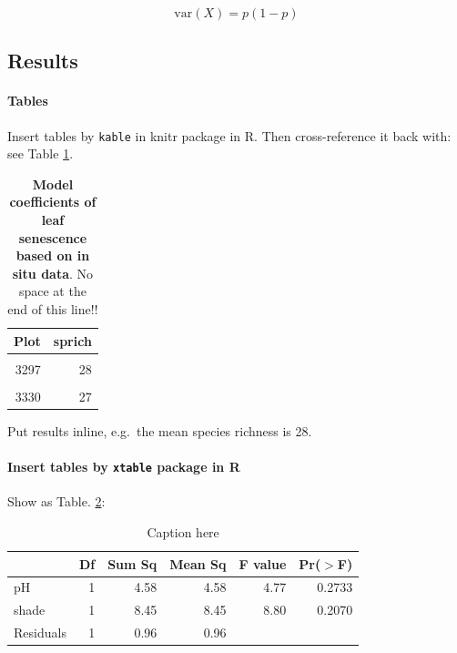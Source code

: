 \documentclass[
  12pt,
]{article}
\begin{document}
\[\text{var}(X) = p(1-p)\]

\hypertarget{results}{%
\subsection{Results}\label{results}}

\hypertarget{tables}{%
\paragraph{Tables}\label{tables}}

Insert tables by \texttt{kable} in knitr package in R. Then cross-reference it back with: see Table \ref{tab:tableName}.



\begin{table}[H]

\caption{\label{tab:tableName}\textbf{Model coefficients of leaf senescence based on in situ data}. No space at the end of this line!!}
\centering
\begin{tabular}[t]{rr}
\toprule
Plot & sprich\\
\midrule
\cellcolor{gray!6}{3294} & \cellcolor{gray!6}{31}\\
3297 & 28\\
\cellcolor{gray!6}{3299} & \cellcolor{gray!6}{26}\\
3330 & 27\\
\bottomrule
\end{tabular}
\end{table}

Put results inline, e.g.~the mean species richness is 28.

\hypertarget{insert-tables-by-xtable-package-in-r}{%
\paragraph{\texorpdfstring{Insert tables by \texttt{xtable} package in R}{Insert tables by xtable package in R}}\label{insert-tables-by-xtable-package-in-r}}

Show as Table. \ref{t:anova}:

\begin{table}[ht]
\centering
\caption{Caption here} 
\label{t:anova}
\begin{tabular}{lrrrrr}
  \toprule
 & Df & Sum Sq & Mean Sq & F value & Pr($>$F) \\ 
  \midrule
pH          & 1 & 4.58 & 4.58 & 4.77 & 0.2733 \\ 
  shade       & 1 & 8.45 & 8.45 & 8.80 & 0.2070 \\ 
  Residuals   & 1 & 0.96 & 0.96 &  &  \\ 
   \bottomrule
\end{tabular}
\end{table}
\end{document}
